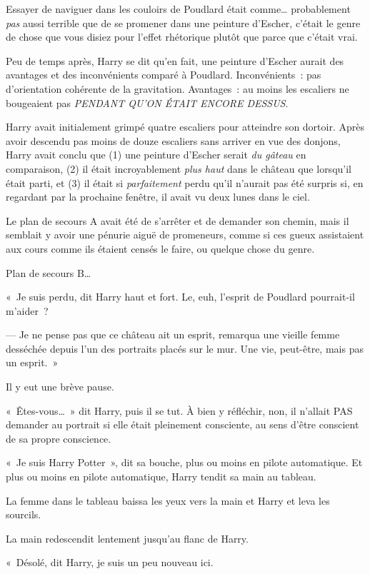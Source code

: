 Essayer de naviguer dans les couloirs de Poudlard était comme… probablement \emph{pas} aussi terrible que de se promener dans une peinture d'Escher, c'était le genre de chose que vous disiez pour l'effet rhétorique plutôt que parce que c'était vrai.

Peu de temps après, Harry se dit qu'en fait, une peinture d'Escher aurait des avantages et des inconvénients comparé à Poudlard. Inconvénients~: pas d'orientation cohérente de la gravitation. Avantages~: au moins les escaliers ne bougeaient pas \emph{PENDANT QU'ON ÉTAIT ENCORE DESSUS}.

Harry avait initialement grimpé quatre escaliers pour atteindre son dortoir. Après avoir descendu pas moins de douze escaliers sans arriver en vue des donjons, Harry avait conclu que (1) une peinture d'Escher serait \emph{du gâteau} en comparaison, (2) il était incroyablement \emph{plus haut} dans le château que lorsqu'il était parti, et (3) il était si \emph{parfaitement} perdu qu'il n'aurait pas été surpris si, en regardant par la prochaine fenêtre, il avait vu deux lunes dans le ciel.

Le plan de secours A avait été de s'arrêter et de demander son chemin, mais il semblait y avoir une pénurie aiguë de promeneurs, comme si ces gueux assistaient aux cours comme ils étaient censés le faire, ou quelque chose du genre.

Plan de secours B…

«~Je suis perdu, dit Harry haut et fort. Le, euh, l'esprit de Poudlard pourrait-il m'aider~?

--- Je ne pense pas que ce château ait un esprit, remarqua une vieille femme desséchée depuis l'un des portraits placés sur le mur. Une vie, peut-être, mais pas un esprit.~»

Il y eut une brève pause.

«~Êtes-vous…~» dit Harry, puis il se tut. À bien y réfléchir, non, il n'allait PAS demander au portrait si elle était pleinement consciente, au sens d'être conscient de sa propre conscience.

«~Je suis Harry Potter~», dit sa bouche, plus ou moins en pilote automatique. Et plus ou moins en pilote automatique, Harry tendit sa main au tableau.

La femme dans le tableau baissa les yeux vers la main et Harry et leva les sourcils.

La main redescendit lentement jusqu'au flanc de Harry.

«~Désolé, dit Harry, je suis un peu nouveau ici.

